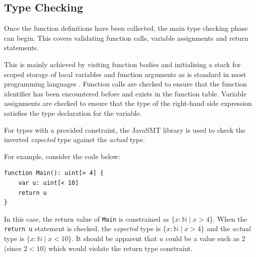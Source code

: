\documentclass[a4paper]{article}
\begin{document}
    \subsection*{Type Checking}
    
    \hfill{}

    Once the function definitions have been collected, the main type checking phase can begin. This covers validating function calls, variable assignments and return statements.
    
    This is mainly achieved by visiting function bodies and initialising a stack for scoped storage of local variables and function arguments as is standard in most programming languages \citep[p. 88]{watt2004programming}. Function calls are checked to ensure that the function identifier has been encountered before and exists in the function table. Variable assignments are checked to ensure that the type of the right-hand side expression satisfies the type declaration for the variable.
   
    
    For types with a provided constraint, the JavaSMT library is used to check the inverted \emph{expected} type against the \emph{actual} type.
    
    For example, consider the code below:
    
\begin{verbatim}
function Main(): uint[> 4] {
    var u: uint[< 10]
    return u
}
\end{verbatim}


    In this case, the return value of \texttt{Main} is constrained as $\{x: \mathbb{N} \mid{} x > 4\}$. When the \texttt{return u} statement is checked, the \emph{expected} type is $\{x: \mathbb{N} \mid{} x > 4\}$ and the \emph{actual} type is $\{x: \mathbb{N} \mid{} x < 10\}$. It should be apparent that $u$ could be a value such as $2$ (since $2 < 10$) which would violate the return type constraint.
    
\end{document}
